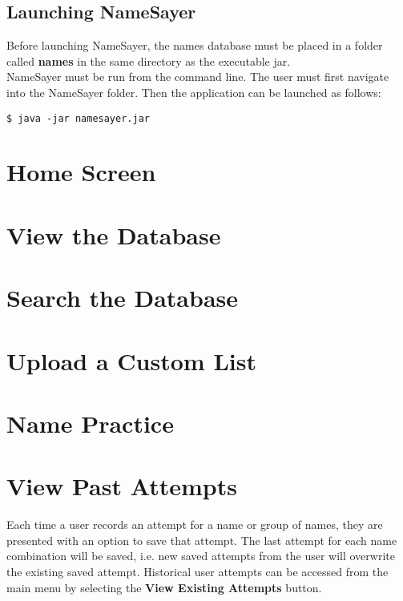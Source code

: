 \documentclass{article}
\begin{document}
\subsection{Launching NameSayer}
Before launching NameSayer, the names database must be placed in a folder called \textbf{names} in the same directory as 
the executable jar. \\

NameSayer must be run from the command line. The user must first navigate into the NameSayer folder. Then the application
can be launched as follows: 

\begin{verbatim}
$ java -jar namesayer.jar
\end{verbatim}

\section{Home Screen}

\section{View the Database}

\section{Search the Database}

\section{Upload a Custom List}

\section{Name Practice}

\section{View Past Attempts}

Each time a user records an attempt for a name or group of names, they are presented with an option to save that attempt.
The last attempt for each name combination will be saved, i.e. new saved attempts from the user will overwrite the existing saved attempt.
Historical user attempts can be accessed from the main menu by selecting the \textbf{View Existing Attempts} button. \\
\end{document}
